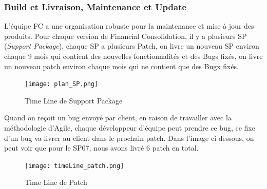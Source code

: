     \subsubsection{Build et Livraison, Maintenance et Update}
    L'équipe FC a une organisation robuste pour la maintenance et mise à jour des produits. Pour chaque version de Financial Consolidation, il y a plusieurs SP (\textit{Support Package}), chaque SP a plusieurs Patch, on livre un nouveau SP environ chaque 9 mois qui contient des nouvelles fonctionnalités et des Bugs fixés, on livre un nouveau patch environ chaque mois qui ne contient que des Bugx fixés.
    \begin{figure}[H]
        \centering
        \texttt{[image: plan\_SP.png]}
        \caption{Time Line de Support Package}
        \label{fig:tileLine_sp}
    \end{figure}
    \par Quand on reçoit un bug envoyé par client,  en raison de travailler avec la méthodologie d'Agile, chaque développeur d'équipe peut prendre ce bug, ce fixe d'un bug va livrer au client dans le prochain patch. Dans l'image ci-dessous, on peut voir que pour le SP07, nous avons livré 6 patch en total.
    
    \begin{figure}[H]
        \centering
        \texttt{[image: timeLine\_patch.png]}
        \caption{Time Line de Patch}
        \label{fig:timeLine_Path}
    \end{figure}
